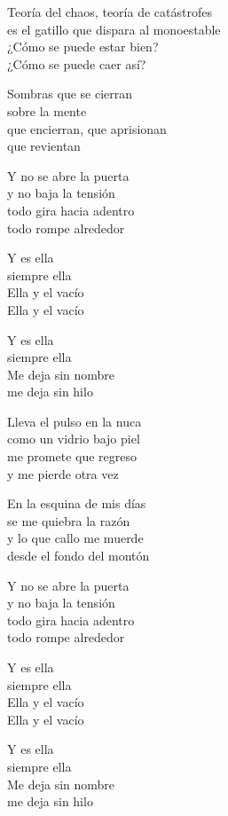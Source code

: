 \begin{lyrics}
Teoría del chaos, teoría de catástrofes\\
es el gatillo que dispara al monoestable\\
¿Cómo se puede estar bien?\\
¿Cómo se puede caer así?

Sombras que se cierran\\
sobre la mente\\
que encierran, que aprisionan\\
que revientan

Y no se abre la puerta\\
y no baja la tensión\\
todo gira hacia adentro\\
todo rompe alrededor

Y es ella\\
siempre ella\\
Ella y el vacío\\
Ella y el vacío

Y es ella\\
siempre ella\\
Me deja sin nombre\\
me deja sin hilo

Lleva el pulso en la nuca\\
como un vidrio bajo piel\\
me promete que regreso\\
y me pierde otra vez

En la esquina de mis días\\
se me quiebra la razón\\
y lo que callo me muerde\\
desde el fondo del montón

Y no se abre la puerta\\
y no baja la tensión\\
todo gira hacia adentro\\
todo rompe alrededor

Y es ella\\
siempre ella\\
Ella y el vacío\\
Ella y el vacío

Y es ella\\
siempre ella\\
Me deja sin nombre\\
me deja sin hilo


\end{lyrics}
